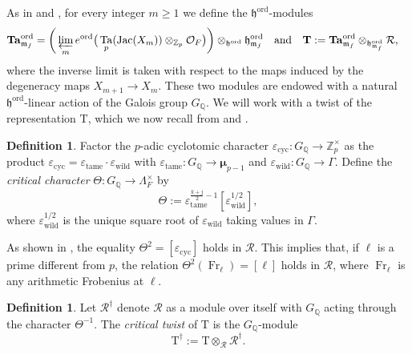 \documentclass[12pt,reqno]{amsart}
\theoremstyle{definition}
\newtheorem{definition}[theorem]{Definition}
\theoremstyle{remark}
\newcommand{\numberset}{\mathbb}
\newcommand{\Q}{\numberset{Q}}
\newcommand{\Z}{\numberset{Z}}
\newcommand{\OF}{\mathcal{O}_F}
\DeclareMathOperator{\Jac}{Jac}
\DeclareMathOperator{\Ta}{Ta}
\newcommand{\Taa}{\boldsymbol{\Ta}}
\newcommand{\T}{\boldsymbol{\mathrm{T}}}
\DeclareMathOperator{\ord}{ord}
\DeclareMathOperator{\Fr}{Fr}
\newcommand{\cyc}{\mathrm{cyc}}
\newcommand{\ta}{\mathrm{tame}}
\newcommand{\wi}{\mathrm{wild}}
\newcommand{\e}{\varepsilon}
\newcommand{\gL}{\Lambda}
\newcommand{\m}{\mathfrak{m}}
\newcommand{\h}{\mathfrak{h}}
\begin{document}
    As in \cite[§2.1]{Howard07:variation-of-Heegner-points-in-Hida-families} and \cite[§5.5]{Longo-Vigni11:quaternion-algebras-Hida-families}, for every integer $m\ge 1$ we define the $\h^{\ord}$-modules
    \begin{equation*}
        \begin{split}
            \Taa^{\ord}_{\m_f}&=\bigg(\varprojlim_m e^{\ord}\big(\Ta_p(\Jac(X_m))\otimes_{\Z_p}\OF \big)\bigg)\otimes_{\h^{\ord}}\h_{\m_f}^{\ord}\quad\text{and}\quad \T:=\Taa^{\ord}_{\m_f}\otimes_{\h_{\m_f}^{\ord}}\mathcal{R},
        \end{split}
    \end{equation*}
    where the inverse limit is taken with respect to the maps induced by the degeneracy maps $X_{m+1}\to X_m$. These two modules are endowed with a natural $\h^{\ord}$-linear action of the Galois group $G_\Q$. We will work with a twist of the representation $\T$, which we now recall from \cite[p. 96]{Howard07:variation-of-Heegner-points-in-Hida-families} and \cite[§5.4]{Longo-Vigni11:quaternion-algebras-Hida-families}.

    \begin{definition}\label{def:self-dual-twist}
        Factor the $p$-adic cyclotomic character $\e_{\cyc}\colon G_\Q\to \Z_p^\times$ as the product $\e_{\cyc}=\e_{\ta}\cdot \e_{\wi}$ with $\e_{\ta}\colon G_\Q\to \boldsymbol{\mu}_{p-1}$ and $\e_{\wi}\colon G_\Q\to \Gamma$. Define the \emph{critical character} $\Theta\colon G_\Q\to \gL_F^\times$ by
        \begin{equation*}
            \Theta:=\e_{\ta}^{\frac{k+j}{2}-1} \left[\e_{\wi}^{1/2}\right],
        \end{equation*}
        where $\e_{\wi}^{1/2}$ is the unique square root of $\e_{\wi}$ taking values in $\Gamma$.
    \end{definition}
    As shown in \cite[(2)]{Howard07:variation-of-Heegner-points-in-Hida-families}, the equality $\Theta^2=[\e_{\cyc}]$ holds in $\mathcal{R}$. This implies that, if $\ell$ is a prime different from $p$, the relation $\Theta^2(\Fr_\ell)=[\ell]$ holds in $\mathcal{R}$, where $\Fr_\ell$ is any arithmetic Frobenius at $\ell$.

   

    \begin{definition}
         Let $\mathcal{R}^\dag$ denote $\mathcal{R}$ as a module over itself with $G_\Q$ acting through the character $\Theta^{-1}$. The \emph{critical twist} of $\T$ is the $G_\Q$-module
        \begin{equation*}
            \T^{\dag}:=\T\otimes_{\mathcal{R}}\mathcal{R}^{\dag}.
        \end{equation*}
    \end{definition}
\end{document}
